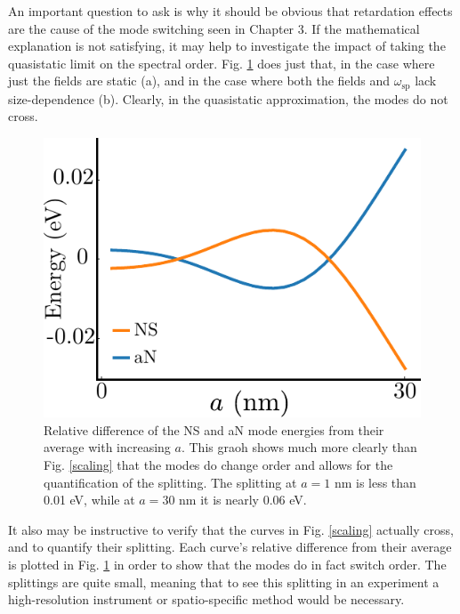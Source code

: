 \documentclass [11pt, proquest] {uwthesis}[2016/11/22]
\begin{document}
An important question to ask is why it should be obvious that retardation effects are the cause of the mode switching seen in Chapter 3. If the mathematical explanation is not satisfying, it may help to investigate the impact of taking the quasistatic limit on the spectral order. Fig. \ref{diff_scale} does just that, in the case where just the fields are static (a), and in the case where both the fields and $\omega_{\textrm{sp}}$ lack size-dependence (b). Clearly, in the quasistatic approximation, the modes do not cross.

\newpage
\begin{figure}
\begin{centering}
\includegraphics{eig_diff_scale.pdf}
\caption{Relative difference of the NS and aN mode energies from their average with increasing $a$. This graoh shows much more clearly than Fig. \ref{scaling} that the modes do change order and allows for the quantification of the splitting. The splitting at $a = 1$ nm is less than 0.01 eV, while at $a = 30$ nm it is nearly 0.06 eV.}
\label{diff_scale}
\end{centering}
\end{figure}

It also may be instructive to verify that the curves in Fig. \ref{scaling} actually cross, and to quantify their splitting. Each curve's relative difference from their average is plotted in Fig. \ref{diff_scale} in order to show that the modes do in fact switch order. The splittings are quite small, meaning that to see this splitting in an experiment a high-resolution instrument or spatio-specific method would be necessary.
\end{document}
